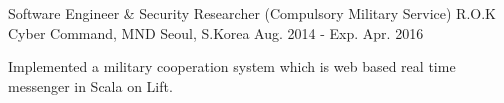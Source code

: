 


\begin{cventries}


\cventry
{Software Engineer \& Security Researcher (Compulsory Military Service)} %
{R.O.K Cyber Command, MND} %
{Seoul, S.Korea} %
{Aug. 2014 - Exp. Apr. 2016} %
{ %
\begin{cvitems}
\item {Implemented a military cooperation system which is web based real time messenger in Scala on Lift.}
\end{cvitems}
}


\end{cventries}